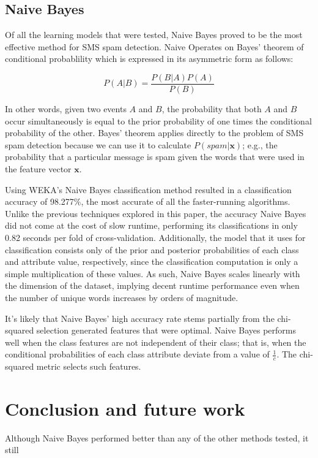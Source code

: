 \documentclass[letterpaper, 10 pt, conference]{ieeeconf}  %
\begin{document}
\subsection{Naive Bayes}
Of all the learning models that were tested, Naive Bayes proved to be
the most effective method for SMS spam detection. Naive Operates on
Bayes' theorem of conditional probablility which is expressed in its
asymmetric form as follows:

\[
P(A|B) = \frac{P(B|A)P(A)}{P(B)}
\]

In other words, given two events $A$ and $B$, the probability that
both $A$ and $B$ occur simultaneously is equal to the prior
probability of one times the conditional probability of the
other. Bayes' theorem applies directly to the problem of SMS spam
detection because we can use it to calculate $P(spam| \mathbf{x})$;
e.g., the probability that a particular message is spam given the
words that were used in the feature vector $\mathbf{x}$.

Using WEKA's Naive Bayes classification method resulted in a
classification accuracy of 98.277\%, the most accurate of all the
faster-running algorithms. Unlike the previous techniques explored in
this paper, the accuracy Naive Bayes did not come at the cost of slow
runtime, performing its classifications in only 0.82 seconds per fold
of cross-validation. Additionally, the model that it uses for
classification consists only of the prior and posterior probabilities
of each class and attribute value, respectively, since the
classification computation is only a simple multiplication of these
values. As such, Naive Bayes scales linearly with the dimension of the
dataset, implying decent runtime performance even when the number of
unique words increases by orders of magnitude.

It's likely that Naive Bayes' high accuracy rate stems partially from
the chi-squared selection generated features that were optimal. Naive
Bayes performs well when the class features are not independent of
their class; that is, when the conditional probabilities of each class
attribute deviate from a value of $\frac{1}{c}$. The chi-squared metric
selects such features.

\section{Conclusion and future work}

Although Naive Bayes performed better than any of the other methods tested, it still
 
\end{document}
